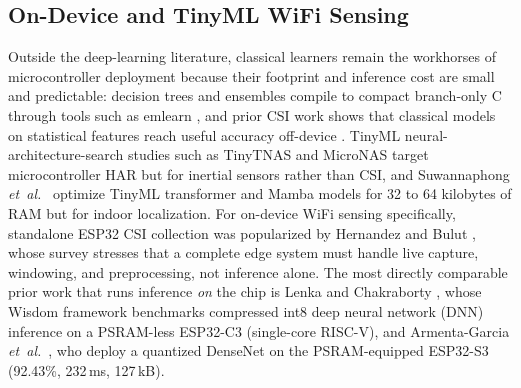 \documentclass{ieeeaccess}
\begin{document}
\subsection{On-Device and TinyML WiFi Sensing}
Outside the deep-learning literature, classical learners remain the workhorses of microcontroller deployment because their footprint and inference cost are small and predictable: decision trees and ensembles compile to compact branch-only C through tools such as emlearn \cite{emlearn}, and prior CSI work shows that classical models on statistical features reach useful accuracy off-device \cite{mdpiclassical}. TinyML neural-architecture-search studies such as TinyTNAS \cite{tinytnas2024} and MicroNAS \cite{micronas2025} target microcontroller HAR but for inertial sensors rather than CSI, and Suwannaphong \emph{et~al.}~\cite{suwannaphong2025tinyml} optimize TinyML transformer and Mamba models for 32 to 64 kilobytes of RAM but for indoor localization. For on-device WiFi sensing specifically, standalone ESP32 CSI collection was popularized by Hernandez and Bulut \cite{hernandez2020lightweight,hernandez2023edge}, whose survey stresses that a complete edge system must handle live capture, windowing, and preprocessing, not inference alone. The most directly comparable prior work that runs inference \emph{on} the chip is Lenka and Chakraborty \cite{lenka2024wisdom}, whose Wisdom framework benchmarks compressed int8 deep neural network (DNN) inference on a PSRAM-less ESP32-C3 (single-core RISC-V), and Armenta-Garcia \emph{et~al.}~\cite{hernandez2025tools}, who deploy a quantized DenseNet on the PSRAM-equipped ESP32-S3 (92.43\%, 232\,ms, 127\,kB).
\end{document}
